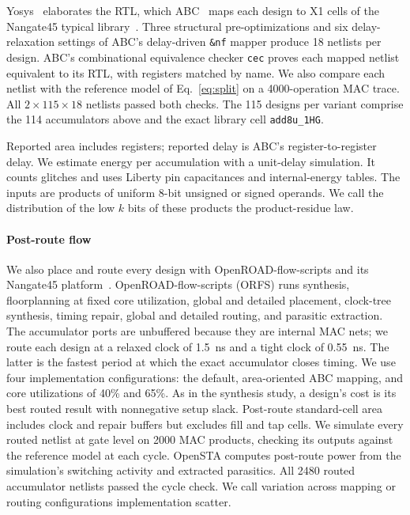 \documentclass[preprint,12pt,numbers]{elsarticle}
\theoremstyle{definition}
\begin{document}
Yosys~\cite{wolf_yosys} elaborates the RTL, which ABC~\cite{brayton2010abc}
maps each design to X1 cells of the Nangate45 typical
library~\cite{nangate45}. Three structural pre-optimizations and
six delay-relaxation settings of ABC's delay-driven \texttt{\&nf} mapper
produce 18 netlists per design. ABC's combinational equivalence checker
\texttt{cec} proves each mapped netlist
equivalent to its RTL, with registers matched by name. We also compare
each netlist with the reference model of Eq.~\eqref{eq:split} on a
4000-operation MAC trace. All $2\times115\times18$ netlists passed both
checks. The 115 designs per variant comprise the 114 accumulators above
and the exact library cell \texttt{add8u\_1HG}.

Reported area includes registers; reported delay is ABC's
register-to-register delay. We estimate energy per accumulation with
a unit-delay simulation. It counts glitches and uses Liberty pin
capacitances and internal-energy tables. The inputs are products of
uniform 8-bit unsigned or signed operands. We call the distribution of
the low $k$ bits of these products the product-residue law.

\paragraph{Post-route flow}
We also place and route every design with OpenROAD-flow-scripts and its
Nangate45 platform~\cite{ajayi2019openroad}. OpenROAD-flow-scripts (ORFS)
runs synthesis,
floorplanning at fixed core utilization, global and detailed placement,
clock-tree synthesis, timing repair, global and detailed routing, and
parasitic extraction. The accumulator ports are unbuffered because they
are internal MAC nets; we route each design at a relaxed clock of
1.5~ns and a tight clock of 0.55~ns. The latter is the fastest period
at which the exact accumulator closes timing. We use four
implementation configurations: the default, area-oriented ABC mapping,
and core utilizations of 40\% and 65\%. As in the synthesis study,
a design's cost is its best routed result
with nonnegative setup slack. Post-route standard-cell area includes clock
and repair buffers but excludes fill and tap cells. We simulate every routed
netlist at gate level on 2000 MAC products, checking its outputs against
the reference model at each cycle.
OpenSTA computes post-route power from the simulation's switching
activity and extracted parasitics. All 2480 routed accumulator
netlists passed the cycle check. We call variation across mapping or
routing configurations implementation scatter.
\end{document}
